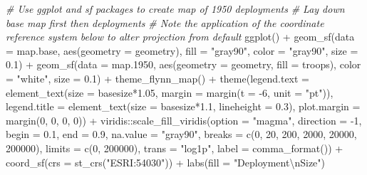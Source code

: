 \documentclass[
]{book}
\newenvironment{Shaded}{\begin{snugshade}}{\end{snugshade}}
\newcommand{\AttributeTok}[1]{\textcolor[rgb]{0.77,0.63,0.00}{#1}}
\newcommand{\CommentTok}[1]{\textcolor[rgb]{0.56,0.35,0.01}{\textit{#1}}}
\newcommand{\DecValTok}[1]{\textcolor[rgb]{0.00,0.00,0.81}{#1}}
\newcommand{\FloatTok}[1]{\textcolor[rgb]{0.00,0.00,0.81}{#1}}
\newcommand{\FunctionTok}[1]{\textcolor[rgb]{0.00,0.00,0.00}{#1}}
\newcommand{\NormalTok}[1]{#1}
\newcommand{\SpecialCharTok}[1]{\textcolor[rgb]{0.00,0.00,0.00}{#1}}
\newcommand{\StringTok}[1]{\textcolor[rgb]{0.31,0.60,0.02}{#1}}
\theoremstyle{definition}
\theoremstyle{definition}
\theoremstyle{definition}
\theoremstyle{definition}
\theoremstyle{remark}
\begin{document}
\begin{Shaded}
\begin{Highlighting}[]
\CommentTok{\# Use ggplot and sf packages to create map of 1950 deployments}
\CommentTok{\# Lay down base map first then deployments}
\CommentTok{\# Note the application of the coordinate reference system below to alter projection from default}
\FunctionTok{ggplot}\NormalTok{() }\SpecialCharTok{+}
  \FunctionTok{geom\_sf}\NormalTok{(}\AttributeTok{data =}\NormalTok{ map.base, }\FunctionTok{aes}\NormalTok{(}\AttributeTok{geometry =}\NormalTok{ geometry), }\AttributeTok{fill =} \StringTok{"gray90"}\NormalTok{, }\AttributeTok{color =} \StringTok{"gray90"}\NormalTok{, }\AttributeTok{size =} \FloatTok{0.1}\NormalTok{) }\SpecialCharTok{+}
  \FunctionTok{geom\_sf}\NormalTok{(}\AttributeTok{data =}\NormalTok{ map}\FloatTok{.1950}\NormalTok{, }\FunctionTok{aes}\NormalTok{(}\AttributeTok{geometry =}\NormalTok{ geometry, }\AttributeTok{fill =}\NormalTok{ troops), }\AttributeTok{color =} \StringTok{"white"}\NormalTok{, }\AttributeTok{size =} \FloatTok{0.1}\NormalTok{) }\SpecialCharTok{+}
  \FunctionTok{theme\_flynn\_map}\NormalTok{() }\SpecialCharTok{+}
  \FunctionTok{theme}\NormalTok{(}\AttributeTok{legend.text =} \FunctionTok{element\_text}\NormalTok{(}\AttributeTok{size =}\NormalTok{ basesize}\SpecialCharTok{*}\FloatTok{1.05}\NormalTok{, }\AttributeTok{margin =} \FunctionTok{margin}\NormalTok{(}\AttributeTok{t =} \SpecialCharTok{{-}}\DecValTok{6}\NormalTok{, }\AttributeTok{unit =} \StringTok{"pt"}\NormalTok{)),}
        \AttributeTok{legend.title =} \FunctionTok{element\_text}\NormalTok{(}\AttributeTok{size =}\NormalTok{ basesize}\SpecialCharTok{*}\FloatTok{1.1}\NormalTok{, }\AttributeTok{lineheight =} \FloatTok{0.3}\NormalTok{),}
        \AttributeTok{plot.margin =} \FunctionTok{margin}\NormalTok{(}\DecValTok{0}\NormalTok{, }\DecValTok{0}\NormalTok{, }\DecValTok{0}\NormalTok{, }\DecValTok{0}\NormalTok{)) }\SpecialCharTok{+}
\NormalTok{  viridis}\SpecialCharTok{::}\FunctionTok{scale\_fill\_viridis}\NormalTok{(}\AttributeTok{option =} \StringTok{"magma"}\NormalTok{, }\AttributeTok{direction =} \SpecialCharTok{{-}}\DecValTok{1}\NormalTok{, }\AttributeTok{begin =} \FloatTok{0.1}\NormalTok{, }\AttributeTok{end =} \FloatTok{0.9}\NormalTok{, }\AttributeTok{na.value =} \StringTok{"gray90"}\NormalTok{, }\AttributeTok{breaks =} \FunctionTok{c}\NormalTok{(}\DecValTok{0}\NormalTok{, }\DecValTok{20}\NormalTok{, }\DecValTok{200}\NormalTok{, }\DecValTok{2000}\NormalTok{, }\DecValTok{20000}\NormalTok{, }\DecValTok{200000}\NormalTok{), }\AttributeTok{limits =} \FunctionTok{c}\NormalTok{(}\DecValTok{0}\NormalTok{, }\DecValTok{200000}\NormalTok{), }\AttributeTok{trans =} \StringTok{"log1p"}\NormalTok{, }\AttributeTok{label =} \FunctionTok{comma\_format}\NormalTok{()) }\SpecialCharTok{+}
  \FunctionTok{coord\_sf}\NormalTok{(}\AttributeTok{crs =} \FunctionTok{st\_crs}\NormalTok{(}\StringTok{"ESRI:54030"}\NormalTok{)) }\SpecialCharTok{+}
  \FunctionTok{labs}\NormalTok{(}\AttributeTok{fill =} \StringTok{"Deployment}\SpecialCharTok{\textbackslash{}n}\StringTok{Size"}\NormalTok{)}
\end{Highlighting}
\end{Shaded}
\end{document}
